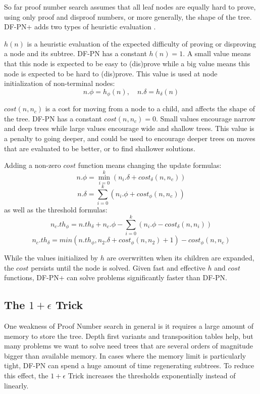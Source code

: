 So far proof number search assumes that all leaf nodes are equally hard to prove, using only proof and disproof numbers, or more generally, the shape of the tree. DF-PN+ adds two types of heuristic evaluation \cite{nagai-thesis}. 

$h(n)$ is a heuristic evaluation of the expected difficulty of proving or disproving a node and its subtree. DF-PN has a constant $h(n) = 1$. A small value means that this node is expected to be easy to (dis)prove while a big value means this node is expected to be hard to (dis)prove. This value is used at node initialization of non-terminal nodes: $$n.\phi = h_\phi(n), \quad n.\delta = h_\delta(n)$$

$cost(n, n_c)$ is a cost for moving from a node to a child, and affects the shape of the tree. DF-PN has a constant $cost(n, n_c) = 0$. Small values encourage narrow and deep trees while large values encourage wide and shallow trees. This value is a penalty to going deeper, and could be used to encourage deeper trees on moves that are evaluated to be better, or to find shallower solutions.

Adding a non-zero $cost$ function means changing the update formulas: $$ n.\phi = \displaystyle\min\limits_{i=0}^k (n_i.\delta + cost_\delta(n, n_c))$$ $$n.\delta = \displaystyle\sum\limits_{i=0}^k (n_i.\phi + cost_\phi(n, n_c))$$ as well as the threshold formulas:
$$n_c.th_\phi = n.th_\delta + n_c.\phi - \displaystyle\sum\limits_{i=0}^k (n_i.\phi - cost_\delta(n, n_i))$$ $$n_c.th_\delta = min(n.th_\phi, n_2.\delta + cost_\phi(n, n_2) + 1) - cost_\phi(n, n_c)$$

While the values initialized by $h$ are overwritten when its children are expanded, the $cost$ persists until the node is solved. Given fast and effective $h$ and $cost$ functions, DF-PN+ can solve problems significantly faster than DF-PN.

\subsection{The $1+\epsilon{}$ Trick} \label{sec:epstrick}

One weakness of Proof Number search in general is it requires a large amount of memory to store the tree. Depth first variants and transposition tables help, but many problems we want to solve need trees that are several orders of magnitude bigger than available memory. In cases where the memory limit is particularly tight, DF-PN can spend a huge amount of time regenerating subtrees. To reduce this effect, the $1+\epsilon$ Trick \cite{pawlewicz2007epsilon} increases the thresholds exponentially instead of linearly.

